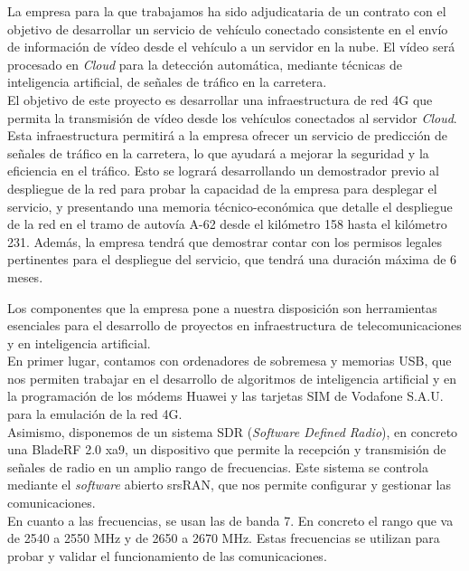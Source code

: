 
La empresa para la que trabajamos ha sido adjudicataria de un contrato con el objetivo de desarrollar un servicio de vehículo conectado consistente en el envío de información de vídeo desde el vehículo a un servidor en la nube. El vídeo será procesado en \textit{Cloud} para la detección automática, mediante técnicas de inteligencia artificial, de señales de tráfico en la carretera.\\

El objetivo de este proyecto es desarrollar una infraestructura de red 4G que permita la transmisión de vídeo desde los vehículos conectados al servidor \textit{Cloud}. Esta infraestructura permitirá a la empresa ofrecer un servicio de predicción de señales de tráfico en la carretera, lo que ayudará a mejorar la seguridad y la eficiencia en el tráfico. Esto se logrará desarrollando un demostrador previo al despliegue de la red para probar la capacidad de la empresa para desplegar el servicio, y presentando una memoria técnico-económica que detalle el despliegue de la red en el tramo de autovía A-62 desde el kilómetro 158 hasta el kilómetro 231. Además, la empresa tendrá que demostrar contar con los permisos legales pertinentes para el despliegue del servicio, que tendrá una duración máxima de 6 meses.

Los componentes que la empresa pone a nuestra disposición son herramientas esenciales para el desarrollo de proyectos en infraestructura de telecomunicaciones y en inteligencia artificial.\\

En primer lugar, contamos con ordenadores de sobremesa y memorias USB, que nos permiten trabajar en el desarrollo de algoritmos de inteligencia artificial y en la programación de los módems Huawei y las tarjetas SIM de Vodafone S.A.U. para la emulación de la red 4G.\\

Asimismo, disponemos de un sistema SDR (\textit{Software Defined Radio}), en concreto una BladeRF 2.0 xa9, un dispositivo que permite la recepción y transmisión de señales de radio en un amplio rango de frecuencias. Este sistema se controla mediante el \textit{software} abierto srsRAN, que nos permite configurar y gestionar las comunicaciones.\\

En cuanto a las frecuencias, se usan las de banda 7. En concreto el rango que va de 2540 a 2550 MHz y de 2650 a 2670 MHz. Estas frecuencias se utilizan para probar y validar el funcionamiento de las comunicaciones.\\

